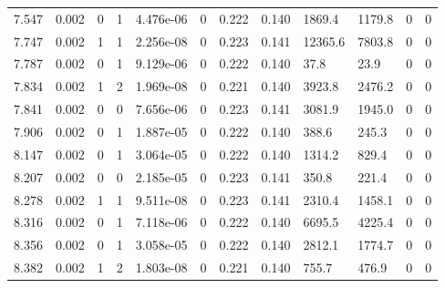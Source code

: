 \documentclass[preview]{standalone}
\begin{document}
{{{\begin{tabular}{L{1.2cm}C{1.2cm} C{0.3cm}C{0.5cm} C{1.4cm}C{1.4cm} C{1.4cm}C{1.4cm} C{1.6cm}C{1.6cm} C{1.6cm}C{1.6cm}}
  7.547  &  0.002  & 0     &  1 &  4.476e-06  & 0  &  0.222&   0.140& 1869.4 & 1179.8   &  0 & 0  \\ 
  7.747  &  0.002  & 1     &  1 &  2.256e-08  & 0  &  0.223&   0.141& 12365.6 & 7803.8   &  0 & 0  \\ 
  7.787  &  0.002  & 0     &  1 &  9.129e-06  & 0  &  0.222&   0.140& 37.8 & 23.9   &  0 & 0  \\ 
  7.834  &  0.002  & 1     &  2 &  1.969e-08  & 0  &  0.221&   0.140& 3923.8 & 2476.2   &  0 & 0  \\ 
  7.841  &  0.002  & 0     &  0 &  7.656e-06  & 0  &  0.223&   0.141& 3081.9 & 1945.0   &  0 & 0  \\ 
  7.906  &  0.002  & 0     &  1 &  1.887e-05  & 0  &  0.222&   0.140& 388.6 & 245.3   &  0 & 0  \\ 
  8.147  &  0.002  & 0     &  1 &  3.064e-05  & 0  &  0.222&   0.140& 1314.2 & 829.4   &  0 & 0  \\ 
  8.207  &  0.002  & 0     &  0 &  2.185e-05  & 0  &  0.223&   0.141& 350.8 & 221.4   &  0 & 0  \\ 
  8.278  &  0.002  & 1     &  1 &  9.511e-08  & 0  &  0.223&   0.141& 2310.4 & 1458.1   &  0 & 0  \\ 
  8.316  &  0.002  & 0     &  1 &  7.118e-06  & 0  &  0.222&   0.140& 6695.5 & 4225.4   &  0 & 0  \\ 
  8.356  &  0.002  & 0     &  1 &  3.058e-05  & 0  &  0.222&   0.140& 2812.1 & 1774.7   &  0 & 0  \\ 
  8.382  &  0.002  & 1     &  2 &  1.803e-08  & 0  &  0.221&   0.140& 755.7 & 476.9   &  0 & 0  \\ 
\hline 
\end{tabular} 

}}}
\end{document}
